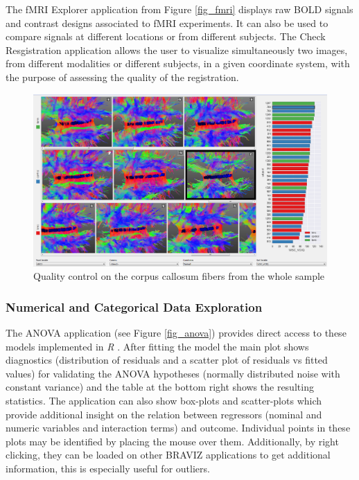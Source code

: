 \documentclass[twocolumn]{svjour3}
\begin{document}
The fMRI Explorer application from Figure \ref{fig_fmri} displays raw BOLD signals and contrast designs associated to fMRI experiments. It can also be used to compare signals at different locations or from different subjects. The Check Resgistration application allows the user to visualize simultaneously two images, from different modalities or different subjects, in a given coordinate system, with the purpose of assessing the quality of the registration.

\begin{figure}
\begin{center}
\includegraphics[width=\linewidth]{quality_control_trim}
\end{center}
 \caption{\label{fig_sample} Quality control on the corpus callosum fibers from the whole sample}
\end{figure}



\subsubsection{Numerical and Categorical Data Exploration}

The ANOVA application (see Figure \ref{fig_anova}) provides direct access to these models implemented in \emph{R} \cite{team_r:_2012}. After fitting the model the main plot shows diagnostics (distribution of residuals and a scatter plot of residuals vs fitted values) for validating the ANOVA hypotheses (normally distributed noise with constant variance) and the table at the bottom right shows the resulting statistics. The application can also show box-plots and scatter-plots which provide additional insight on the relation between regressors (nominal and numeric variables and interaction terms) and outcome. Individual points in these plots may be identified by placing the mouse over them. Additionally, by right clicking, they can be loaded on other BRAVIZ applications to get additional information, this is especially useful for outliers.
\end{document}
